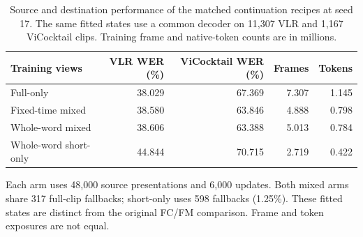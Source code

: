 \begin{table}[tbp]
\centering\small
\setlength{\tabcolsep}{4pt}
\caption{Source and destination performance of the matched continuation recipes
at seed 17. The same fitted states use a common decoder on 11,307 VLR and
1,167 ViCocktail clips. Training frame and native-token counts are in millions.}
\label{tab:crop}
\begin{tabular}{lrrrr}
\toprule
Training views & VLR WER (\%) & ViCocktail WER (\%) & Frames & Tokens\\
\midrule
Full-only & 38.029 & 67.369 & 7.307 & 1.145\\
Fixed-time mixed & 38.580 & 63.846 & 4.888 & 0.798\\
Whole-word mixed & 38.606 & 63.388 & 5.013 & 0.784\\
Whole-word short-only & 44.844 & 70.715 & 2.719 & 0.422\\
\bottomrule
\end{tabular}
\par\smallskip\begin{minipage}{\linewidth}\footnotesize
Each arm uses 48,000 source presentations and 6,000 updates. Both mixed arms
share 317 full-clip fallbacks; short-only uses 598 fallbacks (1.25\%).
These fitted states are distinct from the original FC/FM comparison.
Frame and token exposures are not equal.
\end{minipage}
\end{table}
